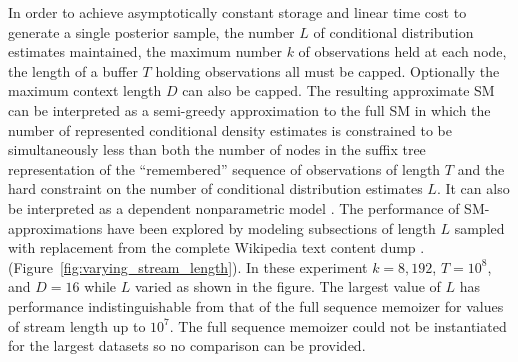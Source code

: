 In order to achieve asymptotically constant storage and linear time cost to generate a single posterior sample, the number  $L$ of conditional distribution estimates maintained, the maximum number $k$ of observations held at each node, the length of a buffer $T$ holding observations  all must be capped.  Optionally the maximum context length $D$ can also be capped.  The resulting approximate SM can be interpreted as a semi-greedy approximation to the full SM in which the number of represented conditional density estimates is constrained to be simultaneously less than both the number of nodes in the suffix tree representation of the ``remembered'' sequence of observations of length $T$ and the hard constraint on the number of conditional distribution estimates $L$.  It can also be interpreted as a dependent nonparametric model \citep{Bartlett2010}.
%
The performance of SM-approximations have been explored by modeling subsections of length $L$ sampled with replacement from the complete Wikipedia text content dump \citep{Wikipedia2010}.  (Figure~\ref{fig:varying_stream_length}).  In these experiment $k=8,192$, $T=10^8$, and $D=16$ while $L$ varied as shown in the figure.   The largest value of $L$ has performance indistinguishable from that of the full sequence memoizer for values of stream length up to $10^7$.  The full sequence memoizer could not be instantiated for the largest datasets so no comparison can be provided. %

